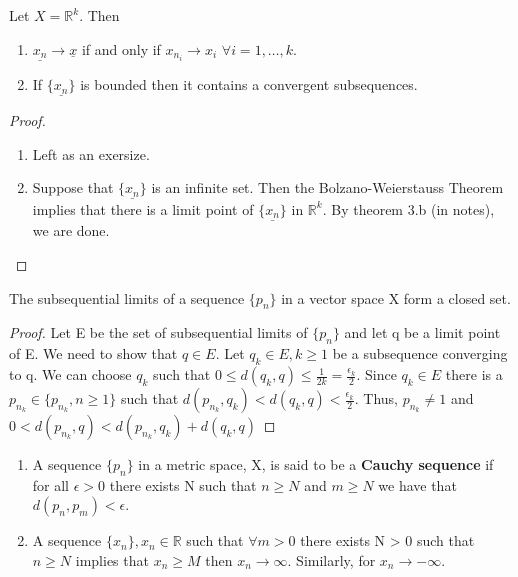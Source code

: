 \documentclass[11pt,fleqn]{book} %
\begin{document}
\begin{theorem}
	Let $X = \mathbb{R}^k$. Then
	\begin{enumerate}[label = \alph*)]
		\item $\underline{x_n} \rightarrow \underline{x}$ if and only if $x_{n_i} \rightarrow x_i$ $\forall i=1, \dots, k$.
		\item If $\{\underline{x_n}\}$ is bounded then it contains a convergent subsequences. 
	\end{enumerate}
\end{theorem}

\begin{proof}
	\begin{enumerate}[label = \alph*)]
		\item Left as an exersize. 
		\item Suppose that $\{\underline{x_n}\}$ is an infinite set. Then the Bolzano-Weierstauss Theorem implies that there is a limit point of $\{\underline{x_n}\}$ in $\mathbb{R}^k$. By theorem 3.b (in notes), we are done.
	\end{enumerate}
\end{proof}

\begin{theorem}
	The subsequential limits of a sequence $\{p_n\}$ in a vector space X form a closed set.
\end{theorem}

\begin{proof}
	Let E be the set of subsequential limits of $\{p_n\}$ and let q be a limit point of E. We need to show that $q \in E$. Let $q_k \in E, k \ge 1$ be a subsequence converging to q. We can choose $q_k$ such that $0 \le d(q_k, q) \le \frac{1}{2k} = \frac{\epsilon_k}{2}$. Since $q_k \in E$ there is a $p_{n_k} \in \{p_{n_k}, n \ge 1\}$ such that $d(p_{n_k}, q_k) < d(q_k, q) < \frac{\epsilon_k}{2}$.
	Thus, $p_{n_k} \neq 1$ and $0 < d(p_{n_k}, q) < d(p_{n_k}, q_k) + d(q_k, q)$
\end{proof}

\begin{definition}
	\begin{enumerate}[label = \alph*)]
		\item A sequence $\{p_n\}$ in a metric space, X, is said to be a \textbf{Cauchy sequence} if for all $\epsilon > 0 $ there exists N such that $n \ge N$ and $m \ge N$ we have that $d(p_n, p_m) < \epsilon$.
		\item A sequence $\{x_n\}, x_n \in \mathbb{R}$ such that $\forall m>0$ there exists N > 0 such that $n \ge N$ implies that $x_n \ge M$ then $x_n \rightarrow \infty$. Similarly, for $x_n \rightarrow -\infty$. 
	\end{enumerate}
\end{definition}
\end{document}

